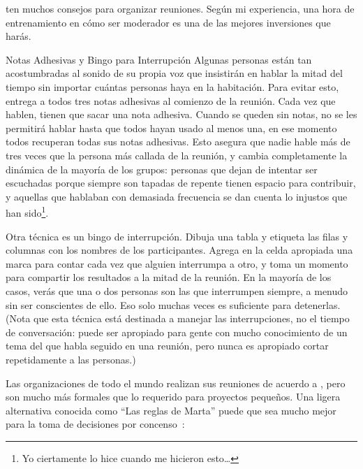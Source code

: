 \cite{Brow2007,Broo2016,Roge2018} ten muchos consejos para organizar reuniones.
Según mi experiencia,
una hora de entrenamiento en cómo ser moderador
es una de las mejores inversiones que harás.

\begin{aside}{Notas Adhesivas y Bingo para Interrupción}
  Algunas personas están tan acostumbradas al sonido de su propia voz
  que insistirán en hablar la mitad del tiempo
  sin importar cuántas personas haya en la habitación.
  Para evitar esto,
  entrega a todos tres notas adhesivas al comienzo de la reunión.
  Cada vez que hablen,
  tienen que sacar una nota adhesiva.
  Cuando se queden sin notas,
  no se les permitirá hablar hasta que todos hayan usado al menos una,
  en ese momento todos recuperan todas sus notas adhesivas.
  Esto asegura que nadie hable más de tres veces que
  la persona más callada de la reunión,
  y cambia completamente la dinámica de la mayoría de los grupos:
  personas que dejan de intentar ser escuchadas porque siempre son tapadas
  de repente tienen espacio para contribuir,
  y aquellas que hablaban con demasiada frecuencia se dan cuenta lo injustos que han sido\footnote{
    Yo ciertamente lo hice cuando me hicieron esto{\ldots}
  }.

  Otra técnica es un bingo de interrupción.
  Dibuja una tabla y etiqueta las filas y columnas con los nombres de los participantes.
  Agrega en la celda apropiada una marca para contar 
  cada vez que alguien interrumpa a otro,
  y toma un momento para compartir los resultados a la mitad de la reunión.
  En la mayoría de los casos,
  verás que una o dos personas son las que interrumpen siempre,
  a menudo sin ser conscientes de ello.
  Eso solo muchas veces es suficiente  para detenerlas.
  (Nota que esta técnica está destinada a manejar las interrupciones,
  no el tiempo de conversación:
  puede ser apropiado para gente con mucho conocimiento de un tema
  del que habla seguido en una reunión,
  pero nunca es apropiado cortar repetidamente a las personas.)
\end{aside}


Las organizaciones de todo el mundo realizan sus reuniones de acuerdo a 
,
pero son mucho más formales que lo requerido para proyectos pequeños.
Una ligera alternativa conocida como ``Las reglas de Marta''
puede que sea mucho mejor para la toma de decisiones por concenso~\cite{Mina1986}:

